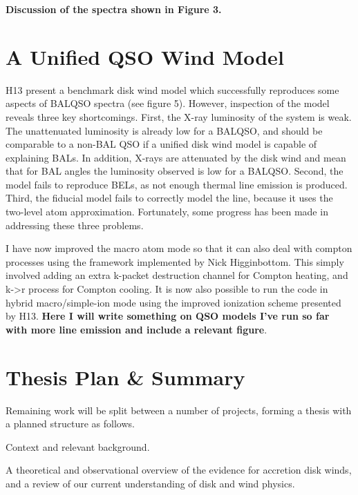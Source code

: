 \documentclass[useAMS,usenatbib,onecolumn]{mn2e2}
\begin{document}
{\bf Discussion of the spectra shown in Figure 3.}

\section{A Unified QSO Wind Model}

H13 present a benchmark disk wind model
which successfully reproduces some aspects of BALQSO spectra (see figure 5). However, inspection
of the model reveals three key shortcomings. First, the X-ray luminosity of the system
is weak. The unattenuated luminosity is already low for a BALQSO, and should be comparable
to a non-BAL QSO if a unified disk wind model is capable of explaining BALs. In addition,
X-rays are attenuated by the disk wind and mean that for BAL angles the luminosity observed
is low for a BALQSO. Second, the model fails to reproduce BELs, as not enough thermal line
emission is produced. Third, the fiducial model fails to correctly model the \la line, because
it uses the two-level atom approximation.
Fortunately, some progress has been made in addressing these three problems.

I have now improved the macro atom mode so that it can also deal
with compton processes using the framework implemented by Nick Higginbottom.
This simply involved adding an extra k-packet destruction channel for Compton 
heating, and k->r process for Compton cooling. 
It is now also possible to run the code in hybrid macro/simple-ion mode
using the improved ionization scheme presented by H13.
{\bf Here I will write something on QSO models I've run so far
with more line emission and include a relevant figure}.

\bigskip



%
%

\newpage
\section{Thesis Plan \& Summary}
\label{future}
\noindent Remaining work will be split between a number of projects, forming a thesis with a planned structure as follows.
\bigskip

 Context and relevant background.

\bigskip

 A theoretical and observational overview of the evidence for accretion disk winds, and a review of our current understanding of disk and wind physics.
\end{document}
